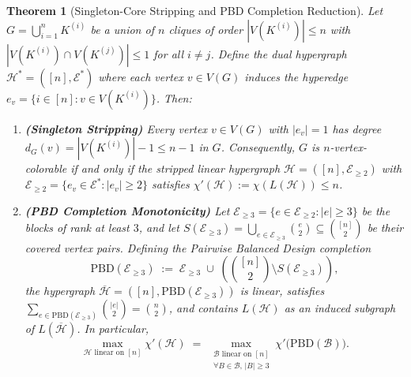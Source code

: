 \documentclass[11pt,reqno]{amsart}
\newtheorem{theorem}{Theorem}[section]
\theoremstyle{definition}
\theoremstyle{remark}
\begin{document}
\begin{theorem}[Singleton-Core Stripping and PBD Completion Reduction]\label{thm:pbd_reduction}
Let $G = \bigcup_{i=1}^n K^{(i)}$ be a union of $n$ cliques of order $|V(K^{(i)})| \le n$ with $|V(K^{(i)}) \cap V(K^{(j)})| \le 1$ for all $i \ne j$. Define the dual hypergraph $\mathcal{H}^* = ([n], \mathcal{E}^*)$ where each vertex $v \in V(G)$ induces the hyperedge $e_v = \{i \in [n] : v \in V(K^{(i)})\}$. Then:
\begin{enumerate}
  \item[\textup{(i)}] \textbf{(Singleton Stripping)} Every vertex $v \in V(G)$ with $|e_v| = 1$ has degree $d_G(v) = |V(K^{(i)})| - 1 \le n - 1$ in $G$. Consequently, $G$ is $n$-vertex-colorable if and only if the stripped linear hypergraph $\mathcal{H} = ([n], \mathcal{E}_{\ge 2})$ with $\mathcal{E}_{\ge 2} = \{e_v \in \mathcal{E}^* : |e_v| \ge 2\}$ satisfies $\chi'(\mathcal{H}) := \chi(L(\mathcal{H})) \le n$.
  \item[\textup{(ii)}] \textbf{(PBD Completion Monotonicity)} Let $\mathcal{E}_{\ge 3} = \{e \in \mathcal{E}_{\ge 2} : |e| \ge 3\}$ be the blocks of rank at least $3$, and let $S(\mathcal{E}_{\ge 3}) = \bigcup_{e \in \mathcal{E}_{\ge 3}} \binom{e}{2} \subseteq \binom{[n]}{2}$ be their covered vertex pairs. Defining the \emph{Pairwise Balanced Design completion}
  \begin{equation}\label{eq:pbd_completion}
    \mathrm{PBD}(\mathcal{E}_{\ge 3}) \;:=\; \mathcal{E}_{\ge 3} \;\cup\; \left( \binom{[n]}{2} \setminus S(\mathcal{E}_{\ge 3}) \right),
  \end{equation}
  the hypergraph $\overline{\mathcal{H}} = ([n], \mathrm{PBD}(\mathcal{E}_{\ge 3}))$ is linear, satisfies $\sum_{e \in \mathrm{PBD}(\mathcal{E}_{\ge 3})} \binom{|e|}{2} = \binom{n}{2}$, and contains $L(\mathcal{H})$ as an induced subgraph of $L(\overline{\mathcal{H}})$. In particular,
  \begin{equation}\label{eq:pbd_max}
    \max_{\mathcal{H} \text{ linear on } [n]} \chi'(\mathcal{H}) \;=\; \max_{\substack{\mathcal{B} \text{ linear on } [n] \\ \forall B \in \mathcal{B},\, |B| \ge 3}} \chi'\bigl(\mathrm{PBD}(\mathcal{B})\bigr).
  \end{equation}
\end{enumerate}
\end{theorem}
\end{document}
